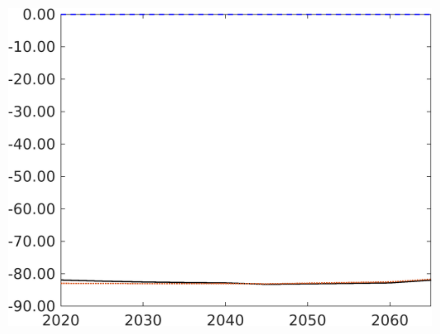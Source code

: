 \begin{figure}[h!!]
\begin{minipage}[]{0.32\textwidth}
 	\end{minipage}
 	\begin{minipage}[]{0.32\textwidth}
 		\includegraphics[width=1\textwidth]{../../codding_model/own_basedOnFried/optimalPol_190722_tidiedUp/figures/all_10Aout22/Per1_CompMod_OPT_T_NoTaus_gAagg_regime3_spillover0_noskill0_sep1_xgrowth0_extern0_etaa0.79_lgd0.png}
 	\end{minipage}
 \end{figure}
 
 

